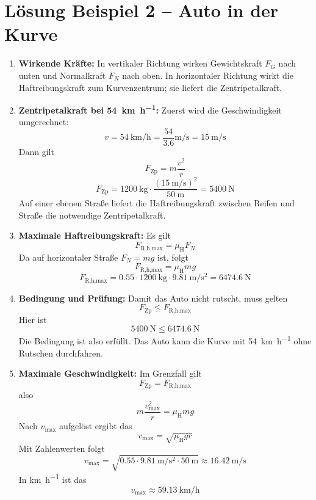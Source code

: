 \documentclass[11pt, a4paper]{article}
\begin{document}
\section*{Lösung Beispiel 2 -- Auto in der Kurve}
\begin{enumerate}
    \item \textbf{Wirkende Kräfte:}
    In vertikaler Richtung wirken Gewichtskraft $F_G$ nach unten und Normalkraft $F_N$ nach oben. In horizontaler Richtung wirkt die Haftreibungskraft zum Kurvenzentrum; sie liefert die Zentripetalkraft.

    \item \textbf{Zentripetalkraft bei \SI{54}{\kilo\metre\per\hour}:}
    Zuerst wird die Geschwindigkeit umgerechnet:
    \[
        v = \SI{54}{\kilo\metre\per\hour} = \frac{54}{3.6} \si{\metre\per\second} = \SI{15}{\metre\per\second}
    \]
    Dann gilt
    \[
        F_{\text{Zp}} = m \frac{v^2}{r}
    \]
    \[
        F_{\text{Zp}} = \SI{1200}{\kilogram} \cdot \frac{(\SI{15}{\metre\per\second})^2}{\SI{50}{\metre}} = \SI{5400}{\newton}
    \]
    Auf einer ebenen Stra\ss{}e liefert die Haftreibungskraft zwischen Reifen und Stra\ss{}e die notwendige Zentripetalkraft.

    \item \textbf{Maximale Haftreibungskraft:}
    Es gilt
    \[
        F_{\text{R,h,max}} = \mu_{\text{H}} F_N
    \]
    Da auf horizontaler Stra\ss{}e $F_N = mg$ ist, folgt
    \[
        F_{\text{R,h,max}} = \mu_{\text{H}} mg
    \]
    \[
        F_{\text{R,h,max}} = \num{0.55} \cdot \SI{1200}{\kilogram} \cdot \SI{9.81}{\metre\per\second\squared} = \SI{6474.6}{\newton}
    \]

    \item \textbf{Bedingung und Pr\"ufung:}
    Damit das Auto nicht rutscht, muss gelten
    \[
        F_{\text{Zp}} \leq F_{\text{R,h,max}}
    \]
    Hier ist
    \[
        \SI{5400}{\newton} \leq \SI{6474.6}{\newton}
    \]
    Die Bedingung ist also erf\"ullt. Das Auto kann die Kurve mit \SI{54}{\kilo\metre\per\hour} ohne Rutschen durchfahren.

    \item \textbf{Maximale Geschwindigkeit:}
    Im Grenzfall gilt
    \[
        F_{\text{Zp}} = F_{\text{R,h,max}}
    \]
    also
    \[
        m \frac{v_{\text{max}}^2}{r} = \mu_{\text{H}} mg
    \]
    Nach $v_{\text{max}}$ aufgel\"ost ergibt das
    \[
        v_{\text{max}} = \sqrt{\mu_{\text{H}} g r}
    \]
    Mit Zahlenwerten folgt
    \[
        v_{\text{max}} = \sqrt{\num{0.55} \cdot \SI{9.81}{\metre\per\second\squared} \cdot \SI{50}{\metre}} \approx \SI{16.42}{\metre\per\second}
    \]
    In \si{\kilo\metre\per\hour} ist das
    \[
        v_{\text{max}} \approx \SI{59.13}{\kilo\metre\per\hour}
    \]
\end{enumerate}
\end{document}
